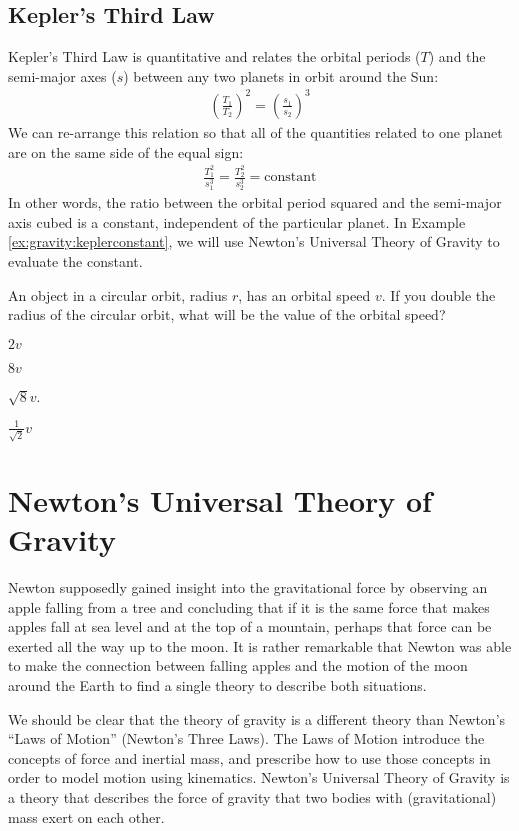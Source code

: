 \subsection{Kepler's Third Law}
Kepler's Third Law is quantitative and relates the orbital periods ($T$) and the semi-major axes ($s$) between any two planets in orbit around the Sun:
\begin{align*}
\left(\frac{T_1}{T_2}\right)^2=\left(\frac{s_1}{s_2}\right)^3
\end{align*}
We can re-arrange this relation so that all of the quantities related to one planet are on the same side of the equal sign:
\begin{align*}
\frac{T_1^2}{s_1^3}=\frac{T_2^2}{s_2^3}=\text{constant}
\end{align*}
In other words, the ratio between the orbital period squared and the semi-major axis cubed is a constant, independent of the particular planet. In Example \ref{ex:gravity:keplerconstant}, we will use Newton's Universal Theory of Gravity to evaluate the constant.

\begin{checkpoint}
\begin{MCquestion}{An object in a circular orbit, radius $r$, has an orbital speed $v$. If you double the radius of the circular orbit, what will be the value of the orbital speed?}
\item $2v$
\item $8v$
\item $\sqrt{8}v$.
\item $\frac{1}{\sqrt{2}}v$ \correct
\end{MCquestion}
\end{checkpoint}

\section{Newton's Universal Theory of Gravity}
Newton supposedly gained insight into the gravitational force by observing an apple falling from a tree and concluding that if it is the same force that makes apples fall at sea level and at the top of a mountain, perhaps that force can be exerted all the way up to the moon. It is rather remarkable that Newton was able to make the connection between falling apples and the motion of the moon around the Earth to find a single theory to describe both situations.

We should be clear that the theory of gravity is a different theory than Newton's ``Laws of Motion'' (Newton's Three Laws). The Laws of Motion introduce the concepts of force and inertial mass, and prescribe how to use those concepts in order to model motion using kinematics. Newton's Universal Theory of Gravity is a theory that describes the force of gravity that two bodies with (gravitational) mass exert on each other.

